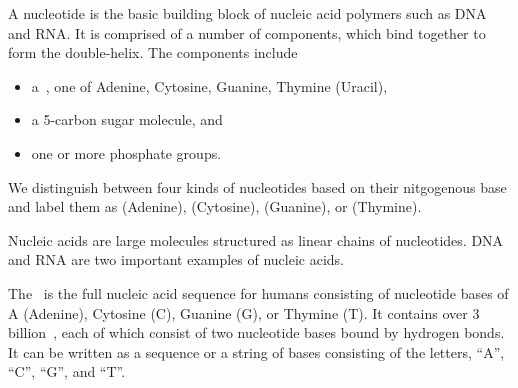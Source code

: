 \begin{cluster}
\label{grp:def:genome::nucleotide}

\begin{definition}[Nucleotide]
\label{def:genome::nucleotide}
A nucleotide is the basic building block of nucleic acid polymers such
as DNA and RNA. 
It is comprised of a number of components, which bind together to form
the double-helix.
The components include 
\begin{itemize}
\item a~, one of Adenine,
Cytosine, Guanine, Thymine (Uracil), 

\item a 5-carbon sugar molecule, and
\item one or more phosphate groups.
\end{itemize}
We distinguish between four kinds of nucleotides based on their
nitgogenous base and label them as  (Adenine), 
(Cytosine),  (Guanine), or  (Thymine).

\end{definition}
\end{cluster}

\begin{cluster}
\label{grp:def:genome::nucleic-acid}

\begin{definition}
\label{def:genome::nucleic-acid}
Nucleic acids are large molecules structured as linear chains of
nucleotides.  DNA and RNA are two important examples of nucleic acids.

\end{definition}
\end{cluster}

\begin{cluster}
\label{grp:def:genome::human-genome}

\begin{definition}
\label{def:genome::human-genome}
The~ is the full nucleic acid sequence for humans
consisting of nucleotide bases of A (Adenine), Cytosine (C),
Guanine (G), or Thymine (T).
It contains over $3$ billion~, each of which consist
of two nucleotide bases bound by hydrogen bonds.
It can be written as a sequence or a string of bases consisting of the
letters, ``A'', ``C'', ``G'', and ``T''.

\end{definition}
\end{cluster}

